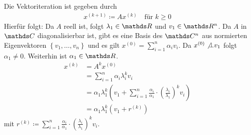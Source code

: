 \label{8.2.2}
Die Vektoriteration ist gegeben durch
\begin{gather}
  x^{(k+1)} \coloneqq Ax^{(k)} \quad \text{für } k\geq 0
  \label{VIII.2.1}
\end{gather}
Hierfür folgt:
Da $A$ reell ist, folgt $\lambda_1\in \R$ und $v_1\in\R^n$.
Da $A$ in $\C$ diagonalisierbar ist,
gibt es eine Basis des $\C^n$ aus
normierten Eigenvektoren $\left\{v_1,\ldots,v_n\right\}$
und es gilt $x^{(0)}= \sum_{i=1}^{n} \alpha_iv_i$.
Da $x^{(0)} \not \bot v_1$ folgt $\alpha_1\neq 0$.
Weiterhin ist $\alpha_1\in\R$.
\begin{align}\nonumber
  x^{(k)} &= A^kx^{(0)} \\\nonumber
          &= \sum_{i=1}^{n} \alpha_i\lambda_i^kv_i\\\nonumber
          &= \alpha_1\lambda_1^k\left(
            v_1+\sum_{i=1}^{n}\frac{\alpha_i}{\alpha_1}
            \cdot \left(\frac{\lambda_i}{\lambda_1}\right)^kv_i
            \right)\\
          &= \alpha_1\lambda_1^k\left( v_1+r^{(k)}  \right)
\label{VIII.2.2}
\end{align}
mit $r^{(k)}\coloneqq \sum_{i=1}^{n}\frac{\alpha_i}{\alpha_1}
            \cdot \left(\frac{\lambda_i}{\lambda_1}\right)^kv_i$.

